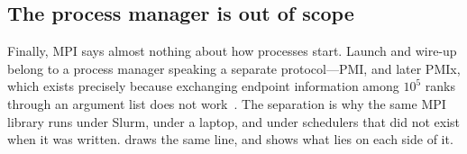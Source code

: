 \subsection{The process manager is out of scope}

Finally, MPI says almost nothing about how processes start. Launch and
wire-up belong to a process manager speaking a separate
protocol---PMI, and later PMIx, which exists precisely because exchanging
endpoint information among $10^5$ ranks through an argument list does not
work~\cite{castain2018pmix}. The separation is why the same MPI library runs
under Slurm, under a laptop, and under schedulers that did not exist when it
was written. \ampi{} draws the same line, and  shows what
lies on each side of it.
